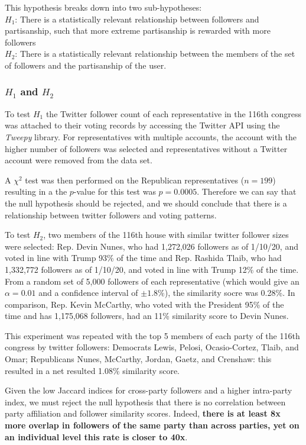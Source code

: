 \documentclass[preprint,review,12pt]{elsarticle}
\begin{document}
This hypothesis breaks down into two sub-hypotheses: \\
\textbf{$H_1$}: There is a statistically relevant relationship between followers and partisanship, such that more extreme partisanship is rewarded with more followers \\
\textbf{$H_2$}: There is a statistically relevant relationship between the members of the set of followers and the partisanship of the user.

 \subsubsection{$H_1$ and $H_2$}
 \label{H_1 and H_2}
 To test $H_1$ the Twitter follower count of each representative in the 116th congress was attached to their voting records by accessing the Twitter API using the \textit{Tweepy} library. For representatives with multiple accounts, the account with the higher number of followers was selected and representatives without a Twitter account were removed from the data set. 

A $\chi^2$ test was then performed on the Republican representatives ($n = 199$) resulting in a the $p$-value for this test was $p=0.0005$. Therefore we can say that the null hypothesis should be rejected, and we should conclude that there is a relationship between twitter followers and voting patterns.

To test $H_2$, two members of the 116th house with similar twitter follower sizes were selected: Rep. Devin Nunes, who had 1,272,026 followers as of 1/10/20, and voted in line with Trump 93\% of the time and Rep. Rashida Tlaib, who had 1,332,772 followers as of 1/10/20, and voted in line with Trump 12\% of the time. From a random set of 5,000 followers of each representative (which would give an $\alpha = 0.01$ and a confidence interval of $\pm 1.8\%$), the similarity socre was 0.28\%. In comparison, Rep. Kevin McCarthy, who voted with the President 95\% of the time and has 1,175,068 followers, had an 11\% similarity score to Devin Nunes.

This experiment was repeated with the top 5 members of each party of the 116th congress by twitter followers: Democrats Lewis, Pelosi, Ocasio-Cortez, Tlaib, and Omar; Republicans Nunes, McCarthy, Jordan, Gaetz, and Crenshaw: this resulted in a net resulted 1.08\% similarity score.

Given the low Jaccard indices for cross-party followers and a higher intra-party index, we must reject the null hypothesis that there is no correlation between party affiliation and follower similarity scores. Indeed, \textbf{there is at least 8x more overlap in followers of the same party than across parties, yet on an individual level this rate is closer to 40x}. 
\end{document}

